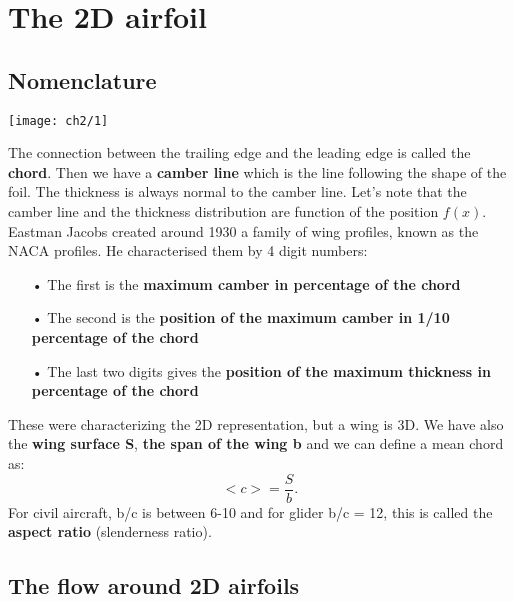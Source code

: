 
\chapter{The 2D airfoil}
	\section{Nomenclature}
		
		\begin{center}
		\texttt{[image: ch2/1]}
		\end{center}
		
		The connection between the trailing edge and the leading edge is called the \textbf{chord}. Then we have a \textbf{camber line} which is the line following the shape of the foil. The thickness is always normal to the camber line. Let's note that the camber line and the thickness distribution are function of the position $f(x)$. \\
		
		Eastman Jacobs created around 1930 a family of wing profiles, known as the NACA profiles. He characterised them by 4 digit numbers: 
		
		\begin{itemize}
			\item[•] The first is the \textbf{maximum camber in percentage of the chord} 
			\item[•] The second is the \textbf{position of the maximum camber in 1/10 percentage of the chord}
			\item[•] The last two digits gives the \textbf{position of the maximum thickness in percentage of the chord}\\
		\end{itemize}				
		
		These were characterizing the 2D representation, but a wing is 3D. We have also the \textbf{wing surface S}, \textbf{the span of the wing b} and we can define a mean chord as: 
		\begin{equation}
		<c> = \frac{S}{b}.
		\end{equation}				
		 For civil aircraft, b/c is between 6-10 and for glider b/c = 12, this is called the \textbf{aspect ratio} (slenderness ratio). 
		 
		 \newpage
		 
	\section{The flow around 2D airfoils}
		
